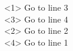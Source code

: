\documentclass[beamer,preview,multi]{standalone}
\begin{document}


\begin{standaloneframe}
\begin{myenv}
\begin{pseudo}
    <1>  Go to line 3  \\
    <3>  Go to line 4  \\
    <2>  Go to line 2  \\
    <4>  Go to line 1  \\
\end{pseudo}
\end{myenv}
\end{standaloneframe}
\end{document}
